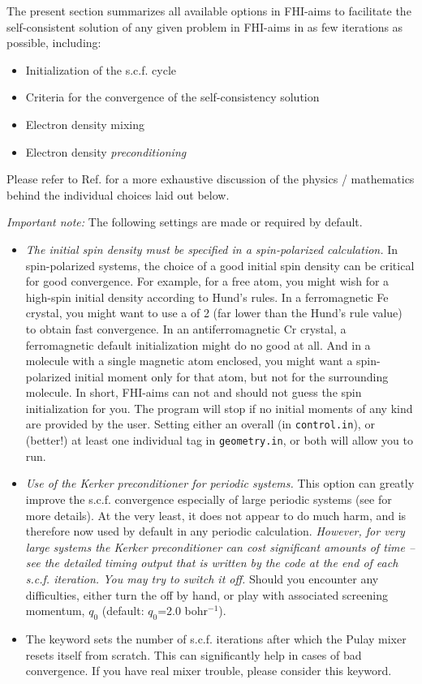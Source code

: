 The present section summarizes all available options in FHI-aims to
facilitate the self-consistent solution of any given problem in
FHI-aims in as few iterations as possible, including:
\begin{itemize}
 \item Initialization of the s.c.f. cycle
 \item Criteria for the convergence of the self-consistency solution
 \item Electron density mixing
 \item Electron density \emph{preconditioning}
\end{itemize}
Please refer to Ref. \cite{Blum08} for a more exhaustive discussion of
the physics / mathematics behind the individual choices laid out
below.

\emph{Important note:} The following settings are made or required by
default.
\begin{itemize}
  \item \emph{The initial spin density must be specified in a spin-polarized
    calculation.} In spin-polarized systems, the choice of a good initial
    spin density can be critical for good convergence. For example, for a free
    atom, you might wish for a high-spin initial density according to Hund's
    rules. In a ferromagnetic Fe crystal, you might want to use a
     of 2 (far lower than the Hund's rule
    value) to obtain fast convergence. In an antiferromagnetic Cr crystal, a
    ferromagnetic default initialization might do no good at all. And in a
    molecule with a single magnetic atom enclosed, you might want a
    spin-polarized initial moment only for that atom, but not for the
    surrounding molecule. In short, FHI-aims can not and should not guess the
    spin initialization for you. The program will stop if no initial
    moments of any kind are provided by the user. Setting either an overall
     (in \texttt{control.in}), or (better!)
    at least one individual  tag in \texttt{geometry.in}, or
    both will allow you to run.
  \item \emph{Use of the Kerker preconditioner for periodic systems.} This
    option can greatly improve the s.c.f. convergence especially of large
    periodic systems (see  for more details). At the
    very least, it does not appear to do much harm, and is therefore now used
    by default in any periodic calculation. {\it
    However, for very large systems the Kerker preconditioner can cost significant
    amounts of time -- see the detailed timing output that is written by the
    code at the end of each s.c.f. iteration. You may try to switch it off.}
    Should you encounter any
    difficulties, either turn the  off by hand, or
    play with associated screening momentum, $q_0$ (default: $q_0$=2.0
    bohr$^{-1}$).
  \item The keyword  sets the number of s.c.f. iterations
    after which the Pulay mixer resets itself from scratch. This can significantly
    help in cases of bad convergence. If you have real mixer trouble, please
    consider this keyword.
\end{itemize}

